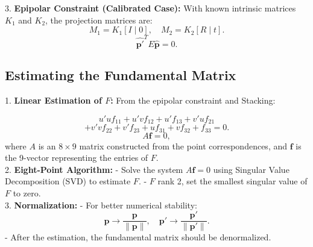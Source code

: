 3. \textbf{Epipolar Constraint (Calibrated Case):}
    With known intrinsic matrices \(K_1\) and \(K_2\), the projection matrices are:
     \[
     M_1 = K_1 [I \mid 0], \quad M_2 = K_2 [R \mid t].
     \]
     \[
     \mathbf{\hat{p'}}^T E \mathbf{\hat{p}} = 0.
     \]
\subsection*{Estimating the Fundamental Matrix}


1. \textbf{Linear Estimation of \( F \):}
   From the epipolar constraint and Stacking:

     \[
     u' u f_{11} + u' v f_{12} + u' f_{13} + v' u f_{21} 
     \]
     \[
     + v' v f_{22}  + v' f_{23} + u f_{31} + v f_{32} + f_{33} = 0.
     \]
     \[
     A \mathbf{f} = 0,
     \]
     where \( A \) is an \( 8 \times 9 \) matrix constructed from the point correspondences, and \( \mathbf{f} \) is the 9-vector representing the entries of \( F \). \\

2. \textbf{Eight-Point Algorithm:}
   - Solve the system \( A \mathbf{f} = 0 \) using Singular Value Decomposition (SVD) to estimate \( F \).
   - \( F \) rank 2, set the smallest singular value of \( F \) to zero. \\

3. \textbf{Normalization:}
   - For better numerical stability:
     \[
     \mathbf{p} \rightarrow \frac{\mathbf{p}}{\|\mathbf{p}\|}, \quad \mathbf{p'} \rightarrow \frac{\mathbf{p'}}{\|\mathbf{p'}\|}.
     \]
   - After the estimation, the fundamental matrix should be denormalized. \\


